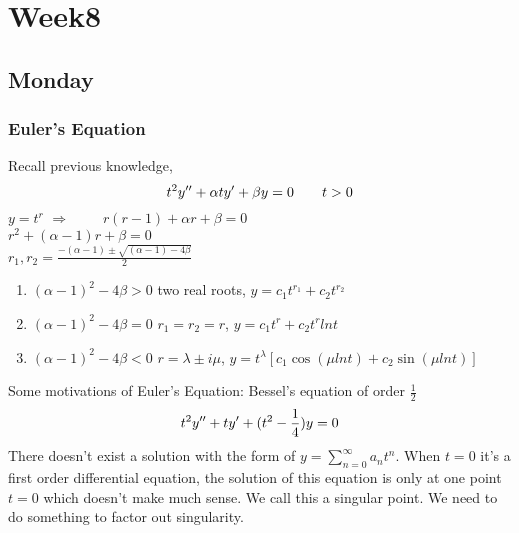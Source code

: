 \chapter{Week8}

\section{Monday}
\subsection{Euler's Equation}
Recall previous knowledge,
\[t^2y^{\prime\prime}+\alpha ty^{\prime}+\beta y=0\qquad t>0
\]
$y=t^r$ $\Rightarrow\qquad$ $r(r-1)+\alpha r+\beta=0$ \\
$r^2+(\alpha-1)r+\beta=0$\\
$r_1,r_2=\frac{-(\alpha-1)\pm\sqrt{(\alpha-1)-4\beta}}{2}$
\begin{enumerate}
\item $(\alpha-1)^2-4\beta>0$  two real roots, $y=c_1t^{r_1}+c_2t^{r_2}$
\item $(\alpha-1)^2-4\beta=0$ $r_1=r_2=r$, $y=c_1t^r+c_2t^rlnt$
\item $(\alpha-1)^2-4\beta<0$ $r=\lambda\pm i\mu$, $y=t^\lambda[c_1\cos(\mu lnt)+c_2\sin(\mu lnt)]$
\end{enumerate}

Some motivations of Euler's Equation: Bessel's equation of order $\frac{1}{2}$\\
\[t^2y^{\prime\prime}+ty^{\prime}+(t^2-\frac{1}{4})y=0
\]
There doesn't exist a solution with the form of $y=\sum_{n=0}^\infty a_nt^n$. When $t=0$ it's a first order differential equation, the solution of this equation is only at one point $t=0$ which doesn't make much sense. We call this a singular point. We need to do something to factor out singularity.\\
